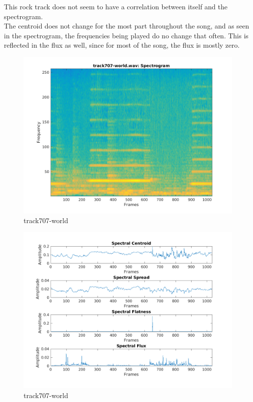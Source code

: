 \documentclass[11pt, a4paper]{article}
\begin{document}
This rock track does not seem to have a correlation between itself and the spectrogram. \\

The centroid does not change for the most part throughout the song, and as seen in the spectrogram, the frequencies being played do no change that often. This is reflected in the flux as well, since for most of the song, the flux is mostly zero. \\


\pagebreak
\begin{figure}[H]
    \centering
    \includegraphics[width=.75\textwidth]{track707-world-specto.png}
    \caption{track707-world}
\end{figure}
\begin{figure}[H]
    \centering
    \includegraphics[width=1\textwidth]{track707-world-spectral.png}
    \caption{track707-world}
\end{figure}
\pagebreak
\end{document}
